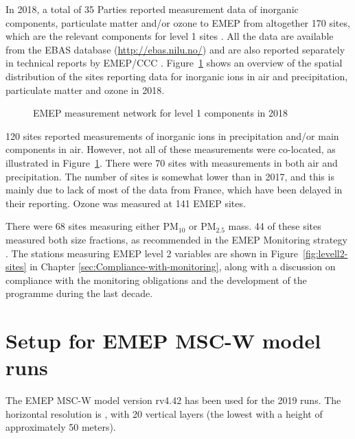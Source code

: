 In 2018, a total of 35 Parties reported measurement data of inorganic components, particulate matter and/or ozone to EMEP from altogether 170 sites, which are the relevant components for level 1 sites \citep{MonStrat2019}. 
All the data are available from the EBAS database (\url{http://ebas.nilu.no/}) and are also reported separately in technical reports by EMEP/CCC \citep{Hjellbrekke2020a,Hjellbrekke2020b}. Figure~\ref{fig:EMEP-measurement-network} shows an overview of the spatial distribution of the sites reporting data for inorganic ions in air and precipitation, particulate matter and ozone in 2018.

\begin{figure}[h!]
 \centering
\caption{\label{fig:EMEP-measurement-network}EMEP measurement network for level 1 components in 2018}
\end{figure}

120 sites reported measurements of inorganic ions in precipitation and/or main components in air. However, not all of these measurements were co-located, as illustrated in Figure~\ref{fig:EMEP-measurement-network}. There were 70 sites with measurements in both air and precipitation. The number of sites is somewhat lower than in 2017, and this is mainly due to lack of most of the data from France, which have been delayed in their reporting. Ozone was measured at 141 EMEP sites.

There were 68 sites measuring either PM$_{10}$ or PM$_{2.5}$ mass. 44 of these sites measured both size fractions, as recommended in the EMEP Monitoring strategy \citep{MonStrat2019}. The stations measuring EMEP level 2 variables are shown in Figure~\ref{fig:levell2-sites} in Chapter \ref{sec:Compliance-with-monitoring}, along with a discussion on compliance with the monitoring obligations and the development of the programme during the last decade.
\section{Setup for EMEP MSC-W model runs}
\label{Mod_2019}

The EMEP MSC-W model version rv4.42 has been used for the 2019
runs. The horizontal resolution is \resZO, with 20 vertical layers
(the lowest with a height of approximately 50 meters).

